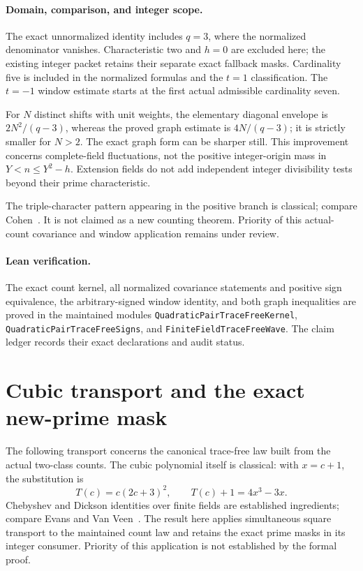 \documentclass[11pt]{article}
\begin{document}
\paragraph{Domain, comparison, and integer scope.}
The exact unnormalized identity includes \(q=3\), where the normalized
denominator vanishes. Characteristic two and \(h=0\) are excluded here;
the existing integer packet retains their separate exact fallback masks.
Cardinality five is included in the normalized formulas and the
\(t=1\) classification. The \(t=-1\) window estimate starts at the
first actual admissible cardinality seven.

For \(N\) distinct shifts with unit weights, the elementary diagonal
envelope is \(2N^2/(q-3)\), whereas the proved graph estimate is
\(4N/(q-3)\); it is strictly smaller for \(N>2\).
The exact graph form can be sharper still.
This improvement concerns complete-field fluctuations, not the positive
integer-origin mass in \(Y<n\le Y^2-h\).
Extension fields do not add independent integer divisibility tests beyond
their prime characteristic.

The triple-character pattern appearing in the positive branch is
classical; compare Cohen~\cite{CohenConsecutivePatterns}.
It is not claimed as a new counting theorem.
Priority of this actual-count covariance and window application remains
under review.

\paragraph{Lean verification.}
The exact count kernel, all normalized covariance statements and positive
sign equivalence, the arbitrary-signed window identity, and both graph
inequalities are proved in the maintained modules
\texttt{QuadraticPairTraceFreeKernel},
\texttt{QuadraticPairTraceFreeSigns}, and
\texttt{FiniteFieldTraceFreeWave}.
The claim ledger records their exact declarations and audit status.

\section{Cubic transport and the exact new-prime mask}
\label{sec:cubic-pair-lift}

The following transport concerns the canonical trace-free law built from
the actual two-class counts. The cubic polynomial itself is classical:
with \(x=c+1\), the substitution is
\[
 T(c)=c(2c+3)^2,\qquad T(c)+1=4x^3-3x.
\]
Chebyshev and Dickson identities over finite fields are established
ingredients; compare Evans and Van Veen~\cite{EvansVanVeenDickson}.
The result here applies simultaneous square transport to the maintained
count law and retains the exact prime masks in its integer consumer.
Priority of this application is not established by the formal proof.
\end{document}
